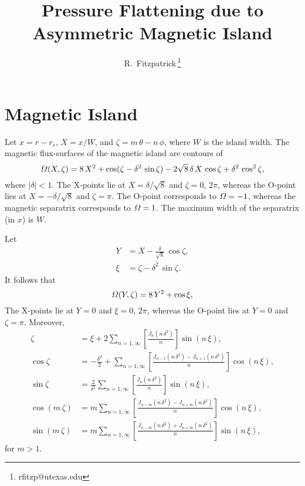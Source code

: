 \documentclass[12pt,prb,aps,notitlepage]{revtex4-1}
\begin{document}
\title{Pressure Flattening due to Asymmetric Magnetic Island}
\author{R.~Fitzpatrick\,\footnote{rfitzp@utexas.edu}}
\begin{abstract}
\end{abstract}
\maketitle

\section{Magnetic Island}
Let $x=r-r_s$, $X=x/W$, and $\zeta= m\,\theta-n\,\phi$, where $W$ is the island width. The magnetic flux-surfaces of the magnetic island are contours of
\begin{equation}
{\mit\Omega}(X,\zeta) = 8\,X^2 + \cos(\zeta-\delta^2\,\sin\zeta) - 2\sqrt{8}\,\delta\,X\,\cos\zeta+\delta^2\,\cos^2\zeta,
\end{equation}
where $|\delta|<1$. 
The X-points lie at $X=\delta/\sqrt{8}$ and $\zeta = 0$, $2\pi$, whereas the O-point lies at
$X=-\delta/\sqrt{8}$ and $\zeta=\pi$. The O-point corresponds to ${\mit\Omega}=-1$, whereas the magnetic separatrix corresponds to ${\mit\Omega}=1$.  
The maximum width of the separatrix (in $x$) is $W$. 

Let
\begin{align}
Y &= X -\frac{\delta}{\sqrt{8}}\,\cos\zeta,\\[0.5ex]
\xi &= \zeta-\delta^2\,\sin\zeta.
\end{align}
It follows that
\begin{equation}
{\mit\Omega}(Y,\zeta) = 8\,Y^2 +\cos\xi,
\end{equation}
The X-points lie at $Y=0$ and $\xi = 0$, $2\pi$, whereas the O-point lies at
$Y=0$ and $\zeta=\pi$. 
Moreover, 
\begin{align}
\zeta &= \xi+2\sum_{n=1,\infty} \left[\frac{J_n(n\,\delta^2)}{n}\right]\sin(n\,\xi),\\[0.5ex]
\cos\zeta&=-\frac{\delta^2}{2}+\sum_{n=1,\infty}\left[\frac{J_{n-1}(n\,\delta^2)-J_{n+1}(n\,\delta^2)}{n}\right]\cos(n\,\xi),\\[0.5ex]
\sin\zeta &= \frac{2}{\delta^2}\sum_{n=1,\infty} \left[\frac{J_n(n\,\delta^2)}{n}\right]\sin(n\,\xi),\\[0.5ex]
\cos(m\,\zeta)&= m\sum_{n=1,\infty}\left[\frac{J_{n-m}(n\,\delta^2)-J_{n+m}(n\,\delta^2)}{n}\right]\cos(n\,\xi),\\[0.5ex]
\sin(m\,\zeta) &= m\sum_{n=1,\infty}\left[\frac{J_{n-m}(n\,\delta^2)+J_{n+m}(n\,\delta^2)}{n}\right]\sin(n\,\xi),
\end{align}
for $m>1$. 
\end{document}
